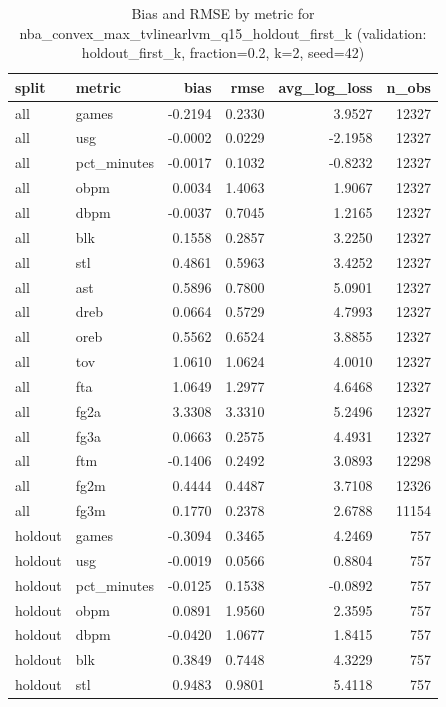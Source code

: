 \begin{table}
\caption{Bias and RMSE by metric for nba_convex_max_tvlinearlvm_q15_holdout_first_k (validation: holdout_first_k, fraction=0.2, k=2, seed=42)}
\label{tab:nba_convex_max_tvlinearlvm_q15_holdout_first_k_vs_holdout_first_k_f20_k2_s42_bias_rmse}
\begin{tabular}{llrrrr}
\toprule
split & metric & bias & rmse & avg\_log\_loss & n\_obs \\
\midrule
all & games & -0.2194 & 0.2330 & 3.9527 & 12327 \\
all & usg & -0.0002 & 0.0229 & -2.1958 & 12327 \\
all & pct\_minutes & -0.0017 & 0.1032 & -0.8232 & 12327 \\
all & obpm & 0.0034 & 1.4063 & 1.9067 & 12327 \\
all & dbpm & -0.0037 & 0.7045 & 1.2165 & 12327 \\
all & blk & 0.1558 & 0.2857 & 3.2250 & 12327 \\
all & stl & 0.4861 & 0.5963 & 3.4252 & 12327 \\
all & ast & 0.5896 & 0.7800 & 5.0901 & 12327 \\
all & dreb & 0.0664 & 0.5729 & 4.7993 & 12327 \\
all & oreb & 0.5562 & 0.6524 & 3.8855 & 12327 \\
all & tov & 1.0610 & 1.0624 & 4.0010 & 12327 \\
all & fta & 1.0649 & 1.2977 & 4.6468 & 12327 \\
all & fg2a & 3.3308 & 3.3310 & 5.2496 & 12327 \\
all & fg3a & 0.0663 & 0.2575 & 4.4931 & 12327 \\
all & ftm & -0.1406 & 0.2492 & 3.0893 & 12298 \\
all & fg2m & 0.4444 & 0.4487 & 3.7108 & 12326 \\
all & fg3m & 0.1770 & 0.2378 & 2.6788 & 11154 \\
holdout & games & -0.3094 & 0.3465 & 4.2469 & 757 \\
holdout & usg & -0.0019 & 0.0566 & 0.8804 & 757 \\
holdout & pct\_minutes & -0.0125 & 0.1538 & -0.0892 & 757 \\
holdout & obpm & 0.0891 & 1.9560 & 2.3595 & 757 \\
holdout & dbpm & -0.0420 & 1.0677 & 1.8415 & 757 \\
holdout & blk & 0.3849 & 0.7448 & 4.3229 & 757 \\
holdout & stl & 0.9483 & 0.9801 & 5.4118 & 757 \\

\end{tabular}
\end{table}
